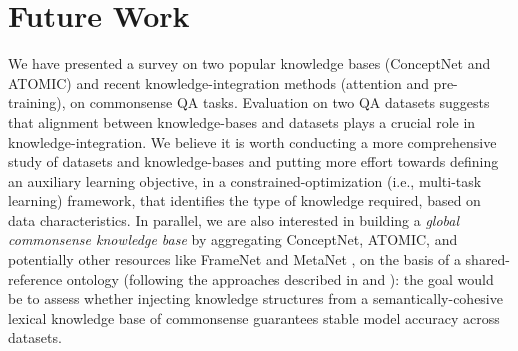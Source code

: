 \documentclass[11pt,a4paper]{article}
\begin{document}
\section{Future Work}
We have presented a survey on two popular knowledge bases (ConceptNet and ATOMIC) and recent knowledge-integration methods (attention and pre-training), on commonsense QA tasks. Evaluation on two QA datasets suggests that alignment between knowledge-bases and datasets plays a crucial role in knowledge-integration. We believe it is worth conducting a more comprehensive study of datasets and knowledge-bases and putting more effort towards defining an auxiliary learning objective, in a constrained-optimization (i.e., multi-task learning) framework, that identifies the type of knowledge required, based on data characteristics. In parallel, we are also interested in building a \textit{global commonsense knowledge base} by aggregating ConceptNet, ATOMIC, and potentially other resources like FrameNet \cite{baker1998berkeley} and MetaNet \cite{dodge2015metanet}, on the basis of a shared-reference ontology (following the approaches described in \cite{gangemi2010interfacing} and \cite{scheffczyk2010reasoning}): the goal would be to assess whether injecting knowledge structures from a semantically-cohesive lexical knowledge base of commonsense guarantees stable model accuracy across datasets. 








\appendix
\end{document}
